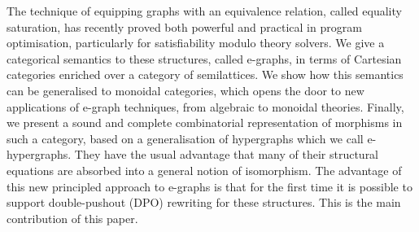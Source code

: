 The technique of equipping graphs with an equivalence relation, called equality saturation, has recently proved both powerful and practical in program optimisation, particularly for satisfiability modulo theory solvers. 
We give a categorical semantics to these structures, called e-graphs, in terms of Cartesian categories enriched over a category of semilattices.
We show how this semantics can be generalised to monoidal categories, which opens the door to new applications of e-graph techniques, from algebraic to monoidal theories.
Finally, we present a sound and complete combinatorial representation of morphisms in such a category,  based on a generalisation of hypergraphs which we call e-hypergraphs.
They have the usual advantage that many of their structural equations are absorbed into a general notion of isomorphism. 
The advantage of this new principled approach to e-graphs is that for the first time it is possible to support double-pushout (DPO) rewriting for these structures. 
This is the main contribution of this paper. 